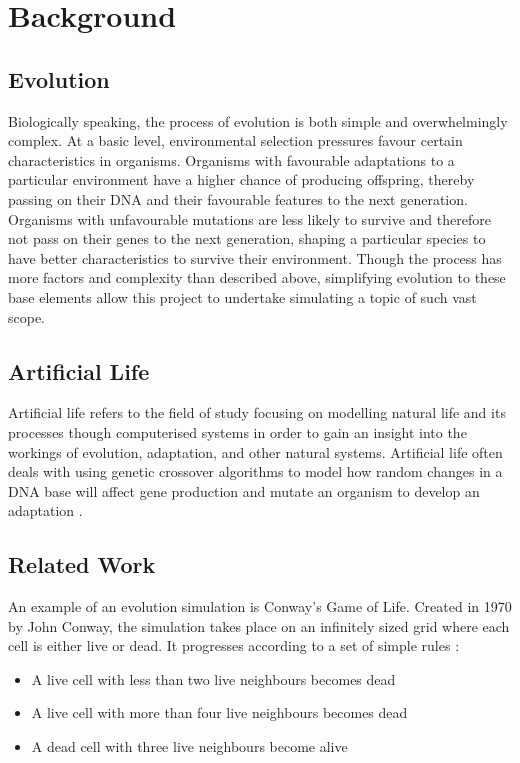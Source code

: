 \documentclass[a4paper, oneside, 11pt]{report}
\begin{document}
\chapter{Background}\label{background}

\section{Evolution}
Biologically speaking, the process of evolution is both simple and overwhelmingly complex. At a basic level, environmental selection pressures favour certain characteristics in organisms. Organisms with favourable adaptations to a particular environment have a higher chance of producing offspring, thereby passing on their DNA and their favourable features to the next generation. Organisms with unfavourable mutations are less likely to survive and therefore not pass on their genes to the next generation, shaping a particular species to have better characteristics to survive their environment. Though the process has more factors and complexity than described above, simplifying evolution to these base elements allow this project to undertake simulating a topic of such vast scope.

\section{Artificial Life}
Artificial life refers to the field of study focusing on modelling natural life and its processes though computerised systems in order to gain an insight into the workings of evolution, adaptation, and other natural systems. Artificial life often deals with using genetic crossover algorithms to model how random changes in a DNA base will affect gene production and mutate an organism to develop an adaptation \cite{grand}.

\section{Related Work}
An example of an evolution simulation is Conway's Game of Life. Created in 1970 by John Conway, the simulation takes place on an infinitely sized grid where each cell is either live or dead. It progresses according to a set of simple rules \cite{guardian}:
\begin{itemize}
	\item A live cell with less than two live neighbours becomes dead
	\item A live cell with more than four live neighbours becomes dead
	\item A dead cell with three live neighbours become alive
\end{itemize}
\end{document}
